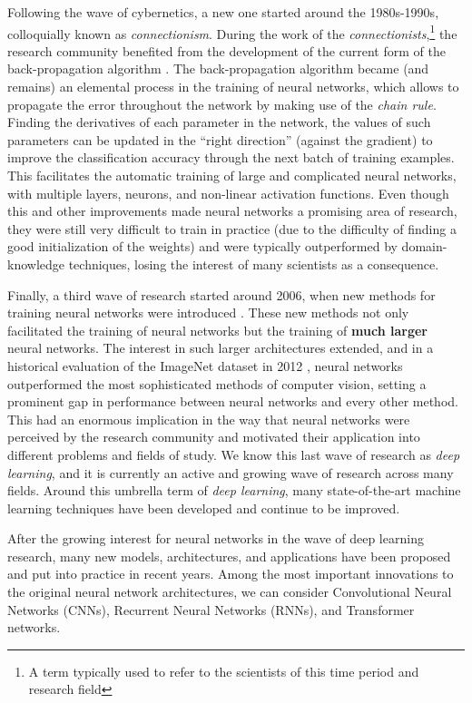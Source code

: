 Following the wave of cybernetics, a new one started around
the 1980s-1990s, colloquially known as \emph{connectionism}.
During the work of the \emph{connectionists},\footnote{A
term typically used to refer to the scientists of this time
period and research field} the research community benefited
from the development of the current form of the
back-propagation algorithm
\parencite{rumelhart1988learning}. The back-propagation
algorithm became (and remains) an elemental process in the
training of neural networks, which allows to propagate the
error throughout the network by making use of the
\emph{chain rule}. Finding the derivatives of each parameter
in the network, the values of such parameters can be updated
in the ``right direction'' (against the gradient) to improve
the classification accuracy through the next batch of
training examples. This facilitates the automatic training
of large and complicated neural networks, with multiple
layers, neurons, and non-linear activation functions. Even
though this and other improvements made neural networks a
promising area of research, they were still very difficult
to train in practice (due to the difficulty of finding a
good initialization of the weights) and were typically
outperformed by domain-knowledge techniques, losing the
interest of many scientists as a consequence.

Finally, a third wave of research started around 2006, when
new methods for training neural networks were introduced
\parencite{hinton2006fast}. These new methods not only
facilitated the training of neural networks but the training
of \textbf{much larger} neural networks. The interest in
such larger architectures extended, and in a historical
evaluation of the ImageNet dataset in 2012
\parencite{krizhevsky2012imagenet}, neural networks
outperformed the most sophisticated methods of computer
vision, setting a prominent gap in performance between
neural networks and every other method. This had an enormous
implication in the way that neural networks were perceived
by the research community and motivated their application
into different problems and fields of study. We know this
last wave of research as \emph{deep learning}, and it is
currently an active and growing wave of research across many
fields. Around this umbrella term of \emph{deep learning},
many state-of-the-art machine learning techniques have been
developed and continue to be improved.

After the growing interest for neural networks in the wave
of deep learning research, many new models, architectures,
and applications have been proposed and put into practice in
recent years.
Among the most important innovations to the original neural
network architectures, we can consider Convolutional Neural
Networks (CNNs), Recurrent Neural Networks
(RNNs), and Transformer networks.
